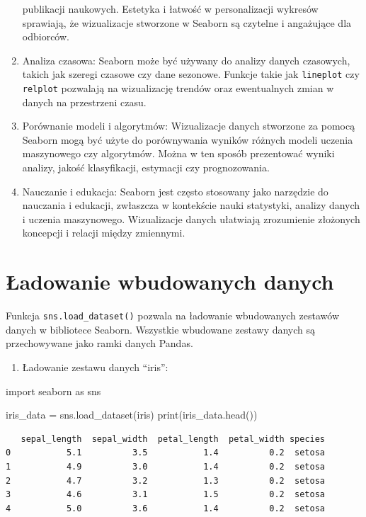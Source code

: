 \documentclass[
  polish,
  letterpaper,
  DIV=11,
  numbers=noendperiod]{scrreprt}
\newenvironment{Shaded}{\begin{snugshade}}{\end{snugshade}}
\newcommand{\BuiltInTok}[1]{\textcolor[rgb]{0.00,0.23,0.31}{#1}}
\newcommand{\ImportTok}[1]{\textcolor[rgb]{0.00,0.46,0.62}{#1}}
\newcommand{\NormalTok}[1]{\textcolor[rgb]{0.00,0.23,0.31}{#1}}
\newcommand{\OperatorTok}[1]{\textcolor[rgb]{0.37,0.37,0.37}{#1}}
\newcommand{\StringTok}[1]{\textcolor[rgb]{0.13,0.47,0.30}{#1}}
\providecommand{\tightlist}{%
  \setlength{\itemsep}{0pt}\setlength{\parskip}{0pt}}
\begin{document}
\begin{enumerate}
  publikacji naukowych. Estetyka i łatwość w personalizacji wykresów
  sprawiają, że wizualizacje stworzone w Seaborn są czytelne i
  angażujące dla odbiorców.
\item
  Analiza czasowa: Seaborn może być używany do analizy danych czasowych,
  takich jak szeregi czasowe czy dane sezonowe. Funkcje takie jak
  \texttt{lineplot} czy \texttt{relplot} pozwalają na wizualizację
  trendów oraz ewentualnych zmian w danych na przestrzeni czasu.
\item
  Porównanie modeli i algorytmów: Wizualizacje danych stworzone za
  pomocą Seaborn mogą być użyte do porównywania wyników różnych modeli
  uczenia maszynowego czy algorytmów. Można w ten sposób prezentować
  wyniki analizy, jakość klasyfikacji, estymacji czy prognozowania.
\item
  Nauczanie i edukacja: Seaborn jest często stosowany jako narzędzie do
  nauczania i edukacji, zwłaszcza w kontekście nauki statystyki, analizy
  danych i uczenia maszynowego. Wizualizacje danych ułatwiają
  zrozumienie złożonych koncepcji i relacji między zmiennymi.
\end{enumerate}

\section{Ładowanie wbudowanych
danych}\label{ux142adowanie-wbudowanych-danych}

Funkcja \texttt{sns.load\_dataset()} pozwala na ładowanie wbudowanych
zestawów danych w bibliotece Seaborn. Wszystkie wbudowane zestawy danych
są przechowywane jako ramki danych Pandas.

\begin{enumerate}
\def\labelenumi{\arabic{enumi}.}
\tightlist
\item
  Ładowanie zestawu danych ``iris'':
\end{enumerate}

\begin{Shaded}
\begin{Highlighting}[]
\ImportTok{import}\NormalTok{ seaborn }\ImportTok{as}\NormalTok{ sns}

\NormalTok{iris\_data }\OperatorTok{=}\NormalTok{ sns.load\_dataset(}\StringTok{\textquotesingle{}iris\textquotesingle{}}\NormalTok{)}
\BuiltInTok{print}\NormalTok{(iris\_data.head())}
\end{Highlighting}
\end{Shaded}

\begin{verbatim}
   sepal_length  sepal_width  petal_length  petal_width species
0           5.1          3.5           1.4          0.2  setosa
1           4.9          3.0           1.4          0.2  setosa
2           4.7          3.2           1.3          0.2  setosa
3           4.6          3.1           1.5          0.2  setosa
4           5.0          3.6           1.4          0.2  setosa
\end{verbatim}
\end{document}

